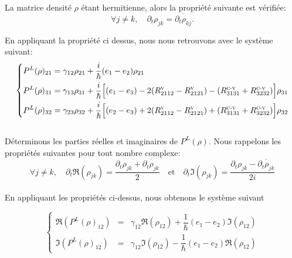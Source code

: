 \documentclass[12pt,a4paper,openany,oneside]{book}
\begin{document}
{{{{{{La matrice densité $ \rho $ étant hermitienne, alors la propriété suivante est vérifiée:
$$ \forall j\neq k , \quad \partial_{t}\rho_{jk} = \overline{\partial_{t}\rho_{kj}}. $$

En appliquant la propriété ci dessus, nous nous retrouvons avec le système suivant:
 \begin{eqnarray*}
 \left\{
 \begin{split}
 P^{L}(\rho)_{21} &= \gamma_{12}\rho_{21}+\dfrac{i}{\hbar}(e_{1}-e_{2})\rho_{21} \\
P^{L}(\rho)_{31} &= \gamma_{13}\rho_{31}+\dfrac{i}{\hbar}\Big[(e_{1}-e_{3})-2(R^{\textsc{v}}_{2112}-R^{\textsc{v}}_{2121})-(R^{\textsc{c-v}}_{3131}+ R^{\textsc{c-v}}_{3232})\Big]\rho_{31}\\ 
 P^{L}(\rho)_{32}&= \gamma_{23}\rho_{32}+\dfrac{i}{\hbar}\Big[(e_{2}-e_{3})+2(R^{\textsc{v}}_{2112}-R^{\textsc{v}}_{2121})+(R^{\textsc{c-v}}_{3131} + R^{\textsc{c-v}}_{3232})\Big]\rho_{32}
  \end{split}
  \right.
  \end{eqnarray*}\\

Déterminons les parties réelles et imaginaires de $ P^{L}(\rho) $.
Nous rappelons les propriétés suivantes pour tout nombre complexe: 
 $$ \forall j\neq k , \quad \partial_{t}\Re(\rho_{jk})= \dfrac{\partial_{t}\rho_{jk} +\overline{\partial_{t}\rho_{jk}}}{2} \quad \textrm{et}\quad \partial_{t}\Im(\rho_{jk})= \dfrac{\partial_{t}\rho_{jk} -\overline{\partial_{t}\rho_{jk}}}{2i}$$\\
 
 En appliquant les propriétés ci-dessus, nous obtenons le système suivant

$$ \left\{
   \begin{array}{rcl}
\Re(P^{L}(\rho)_{12}) & = & \gamma_{12}\Re(\rho_{12})+\dfrac{1}{\hbar}(e_{1}-e_{2})\Im(\rho_{12}) \\
\Im(P^{L}(\rho)_{12}) & = & \gamma_{12}\Im(\rho_{12})-\dfrac{1}{\hbar}(e_{1}-e_{2})\Re(\rho_{12})
   \end{array}
 \right. $$
 
}}}}}}
\end{document}
